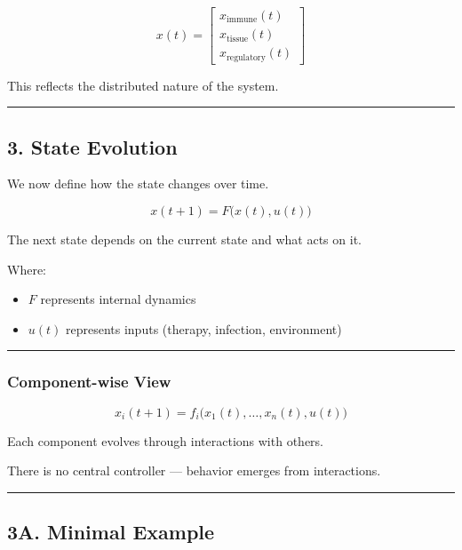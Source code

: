 \documentclass[
  letterpaper,
  DIV=11,
  numbers=noendperiod]{scrartcl}
\providecommand{\tightlist}{%
  \setlength{\itemsep}{0pt}\setlength{\parskip}{0pt}}
\begin{document}
\[
x(t) =
\begin{bmatrix}
x_{\text{immune}}(t) \\
x_{\text{tissue}}(t) \\
x_{\text{regulatory}}(t)
\end{bmatrix}
\]

This reflects the distributed nature of the system.

\begin{center}\rule{0.5\linewidth}{0.5pt}\end{center}

\subsection{3. State Evolution}\label{state-evolution}

We now define how the state changes over time.

\[
x(t+1) = F\big(x(t), u(t)\big)
\]

The next state depends on the current state and what acts on it.

Where:

\begin{itemize}
\tightlist
\item
  \(F\) represents internal dynamics\\
\item
  \(u(t)\) represents inputs (therapy, infection, environment)
\end{itemize}

\begin{center}\rule{0.5\linewidth}{0.5pt}\end{center}

\subsubsection{Component-wise View}\label{component-wise-view}

\[
x_i(t+1) = f_i\big(x_1(t), \dots, x_n(t), u(t)\big)
\]

Each component evolves through interactions with others.

There is no central controller --- behavior emerges from interactions.

\begin{center}\rule{0.5\linewidth}{0.5pt}\end{center}

\subsection{3A. Minimal Example}\label{a.-minimal-example}
\end{document}
